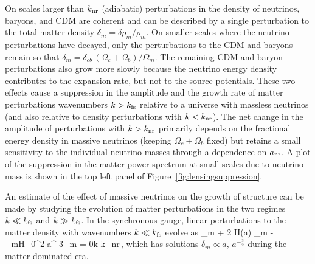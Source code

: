 On scales larger than $k_{\rm nr}$ (adiabatic) perturbations in the density of neutrinos, baryons, and CDM are coherent and can be described by a single perturbation to the total matter density $\delta_m= \delta \rho_m/\rho_m$. On smaller scales where the neutrino perturbations have decayed, only the perturbations to the CDM and baryons remain so that $\delta_{m} = \delta_{cb}\, (\Omega_{c} + \Omega_b)/\Omega_m $. The remaining CDM and baryon perturbations also grow more slowly because the neutrino energy density contributes to the expansion rate, but not to the source potentials. These two effects cause a suppression in the amplitude and the growth rate of matter perturbations wavenumbers $k > k_{\rm fs}$ relative to a universe with massless neutrinos (and also relative to density perturbations with $k<k_{\rm nr}$). The net change in the amplitude of perturbations with $k > k_{\rm nr}$ primarily depends on the fractional energy density in massive neutrinos (keeping $\Omega_c+\Omega_b$ fixed) but retains a small sensitivity to the individual neutrino masses through a dependence on $a_{\rm nr}$. A plot of the suppression in the matter power spectrum at small scales due to neutrino mass is shown in the top left panel of Figure~\ref{fig:lensingsuppression}.







An estimate of the effect of massive neutrinos on the growth of structure can be made by studying the evolution of matter perturbations in the two regimes $k\ll k_{\rm fs}$ and $k\gg k_{\rm fs}$.  In the synchronous gauge, linear perturbations to the matter density with wavenumbers $k \ll k_{\rm fs}$ evolve as
\beq
\label{eq:ddotdeltalarge}
\ddot{\delta}_m + 2 H(a) \dot\delta_m - \Omega_mH_0^2 a^{-3}\delta_m = 0\quad k \ll k_{\rm nr}\,,
\eeq
which has solutions $\delta_m \propto a, \, a^{-\frac{3}{2}}$ during the matter dominated era. %

